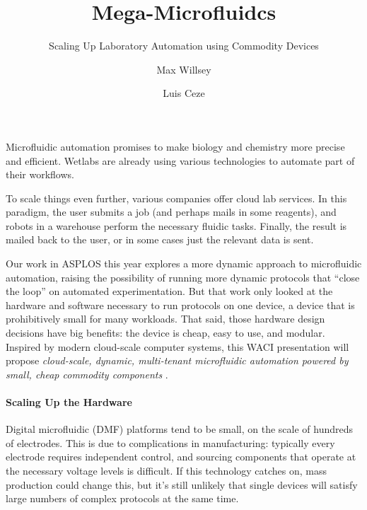 \documentclass[sigplan, screen, nonacm]{acmart}
\title{Mega-Microfluidcs}
\subtitle{Scaling Up Laboratory Automation using Commodity Devices}
\author{Max Willsey}
\affiliation{University of Washington}
\author{Luis Ceze}
\affiliation{University of Washington}
\begin{document}
\begin{teaserfigure}
  \hfill
{}
  \hfill
\vspace{1em}
\end{teaserfigure}

\maketitle

Microfluidic automation promises to make biology and chemistry more precise and efficient.
Wetlabs are already using various technologies to automate part of their workflows.

To scale things even further, various companies offer cloud lab services.
In this paradigm, the user submits a job (and perhaps mails in some reagents), and robots in a warehouse perform the necessary fluidic tasks.
Finally, the result is mailed back to the user, or in some cases just the relevant data is sent.

Our work \cite{willsey2019puddle} in ASPLOS this year explores a more dynamic approach to microfluidic automation, raising the possibility of running more dynamic protocols that ``close the loop'' on automated experimentation.
But that work only looked at the hardware and software necessary to run protocols on one device, a device that is prohibitively small for many workloads.
That said, those hardware design decisions have big benefits: the device is cheap, easy to use, and modular.
Inspired by modern cloud-scale computer systems, this WACI presentation will propose
\emph{
  cloud-scale, dynamic, multi-tenant microfluidic automation
  powered by small, cheap commodity components
}.


\paragraph{Scaling Up the Hardware}
Digital microfluidic (DMF) platforms tend to be small, on the scale of hundreds of electrodes.
This is due to complications in manufacturing: typically every electrode requires independent control, and sourcing components that operate at the necessary voltage levels is difficult.
If this technology catches on, mass production could change this, but it's still unlikely that single devices will satisfy large numbers of complex protocols at the same time.
\end{document}
